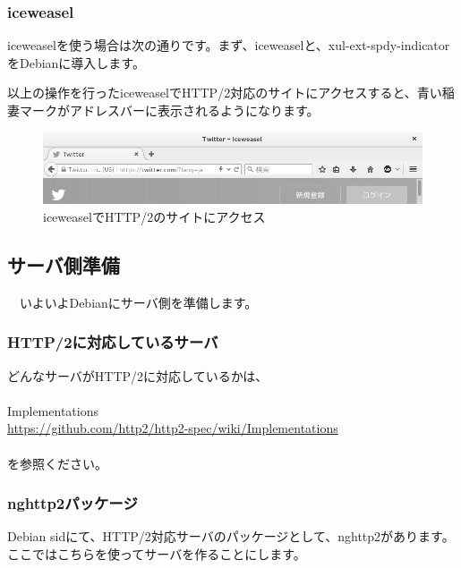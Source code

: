 \documentclass[mingoth,a4paper]{jsarticle}
\begin{document}
\subsubsection{iceweasel}

 iceweaselを使う場合は次の通りです。まず、iceweaselと、xul-ext-spdy-indicatorをDebianに導入します。
  

以上の操作を行ったiceweaselでHTTP/2対応のサイトにアクセスすると、青い稲妻マークがアドレスバーに表示されるようになります。

\begin{figure}[H]
\begin{center}
 \includegraphics[width=0.9\hsize]{image201507/iceweasel-http-2-ready_mono.png}
\end{center}
\caption{iceweaselでHTTP/2のサイトにアクセス}
\end{figure}

\subsection{サーバ側準備}

　いよいよDebianにサーバ側を準備します。

\subsubsection{HTTP/2に対応しているサーバ}

 どんなサーバがHTTP/2に対応しているかは、\\
\\
 Implementations \\
  \url{https://github.com/http2/http2-spec/wiki/Implementations}\\
\\
 を参照ください。

\subsubsection{nghttp2パッケージ}

 Debian sidにて、HTTP/2対応サーバのパッケージとして、nghttp2があります。ここではこちらを使ってサーバを作ることにします。
\end{document}
